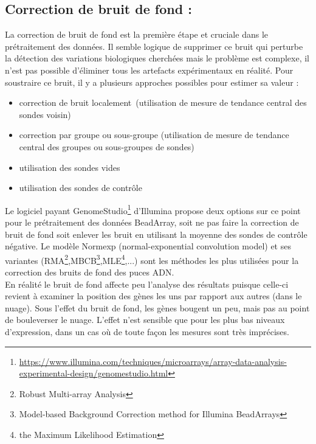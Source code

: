 \documentclass[a4paper,10pt]{article}
\begin{document}
\subsection{Correction de bruit de fond :}
La correction de bruit de fond est la première étape et cruciale dans le prétraitement des données. Il semble logique de supprimer ce bruit qui perturbe la détection des variations biologiques cherchées  mais le problème est complexe, il n’est pas possible d’éliminer tous les artefacts expérimentaux en réalité. 
Pour soustraire ce bruit, il y a plusieurs approches possibles pour estimer sa valeur :
\begin{itemize}
 \item correction de bruit localement (utilisation de mesure de tendance central des sondes voisin)
 \item correction par groupe ou sous-groupe (utilisation de mesure de tendance central des groupes ou sous-groupes de sondes)
 \item utilisation des sondes vides
 \item utilisation des sondes de contrôle
\end{itemize}
Le logiciel payant  GenomeStudio\footnote{\url{https://www.illumina.com/techniques/microarrays/array-data-analysis-experimental-design/genomestudio.html}} d’Illumina propose deux options sur ce point pour le prétraitement des données BeadArray\cite{xie2009statistical}, soit ne pas faire la correction de bruit de fond soit enlever les bruit en utilisant la moyenne des sondes de contrôle négative. 
Le modèle Normexp (normal-exponential convolution model) et ses variantes (RMA\footnote{Robust Multi-array Analysis},MBCB\footnote{Model-based Background Correction method for Illumina BeadArrays},MLE\footnote{the Maximum Likelihood Estimation},...) sont les méthodes les plus utilisées pour la correction des bruits de fond des puces ADN.
\\En réalité le bruit de fond affecte peu l’analyse des résultats puisque celle-ci revient à examiner la position des gènes les uns par rapport aux autres (dans le nuage). Sous l’effet du bruit de fond, les gènes bougent un peu, mais pas au point de bouleverser le nuage. L’effet n’est sensible que pour les plus bas niveaux d’expression, dans un cas où de toute façon les mesures sont très imprécises. 
\end{document}
